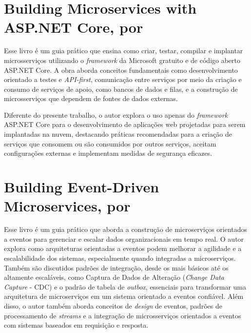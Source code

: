 
\section{Building Microservices with ASP.NET Core, por \texorpdfstring{}{Hoffman (2017)}}

Esse livro é um guia prático que ensina como criar, testar, compilar e implantar microsserviços utilizando o \emph{framework} da Microsoft gratuito e de código aberto ASP.NET Core. A obra aborda conceitos fundamentais como desenvolvimento orientado a testes e \emph{API-first}, comunicação entre serviços por meio da criação e consumo de serviços de apoio, como bancos de dados e filas, e a construção de microsserviços que dependem de fontes de dados externas.

Diferente do presente trabalho, o autor explora o uso apenas do \emph{framework} ASP.NET Core para o desenvolvimento de aplicações web projetadas para serem implantadas na nuvem, destacando práticas recomendadas para a criação de serviços que consomem ou são consumidos por outros serviços, aceitam configurações externas e implementam medidas de segurança eficazes. 


\section{Building Event-Driven Microservices, por \texorpdfstring{}{Bellemare (2020)}}
Esse livro é um guia prático que aborda a construção de microserviços orientados a eventos para gerenciar e escalar dados organizacionais em tempo real. O autor explora como arquiteturas orientadas a eventos podem melhorar a agilidade e a escalabilidade dos sistemas, especialmente quando integradas a microserviços. Também são discutidos padrões de integração, desde os mais básicos até os altamente escaláveis, como Captura de Dados de Alteração (\emph{Change Data Capture} - CDC) e o padrão de tabela de \emph{outbox}, essenciais para transformar uma arquitetura de microserviços em um sistema orientado a eventos confiável. Além disso, o autor também aborda conceitos de \emph{design} de eventos, padrões de processamento de \emph{streams} e a integração de microsserviços orientados a eventos com sistemas baseados em requisição e resposta. 

